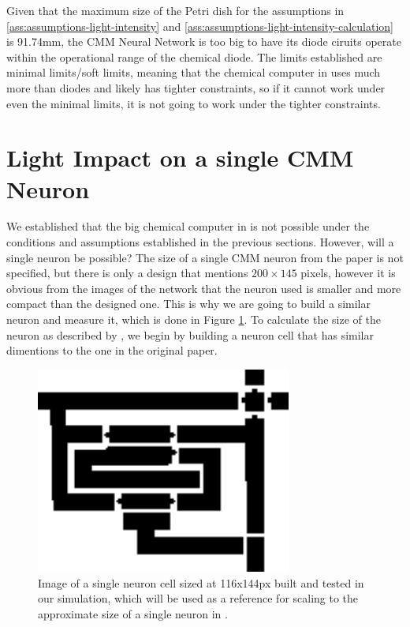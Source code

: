 Given that the maximum size of the Petri dish for the assumptions in \ref{ass:assumptions-light-intensity} and \ref{ass:assumptions-light-intensity-calculation} is 91.74mm, the CMM Neural Network is too big to 
have its diode ciruits operate within the operational range of the chemical diode. 
The limits established are minimal limits/soft limits, meaning that the chemical computer in \cite{stovold2017reaction} uses much more than diodes and 
likely has tighter constraints, so if it cannot work under even the minimal limits, it is not going to work under the tighter constraints. 
    

\section{Light Impact on a single CMM Neuron \citep{stovold2017reaction}} \label{sec:light-impact-cmm-neuron-single}

We established that the big chemical computer in \cite{stovold2017reaction} is not possible under the conditions and assumptions established in the previous sections.
However, will a single neuron be possible? 
The size of a single CMM neuron from the paper is not specified, but there is only a design that mentions $200 \times 145$ pixels, however it is 
obvious from the images of the network that the neuron used is smaller and more compact than the designed one. This is why we are going to build a similar neuron
and measure it, which is done in Figure \ref{fig:neuron-cell-built}.
To calculate the size of the neuron as described by \cite{stovold2017reaction}, we begin by building a neuron cell 
that has similar dimentions to the one in the original paper.

\begin{figure}[h]
    \centering
    \includegraphics[width=0.75\textwidth]{images/circuit2-Recovered.png}
    \caption{Image of a single neuron cell sized at 116x144px built and tested in our simulation, which will be used as a reference for scaling to the approximate size of a single neuron in \cite{stovold2017reaction}.}
    \label{fig:neuron-cell-built}
\end{figure}


